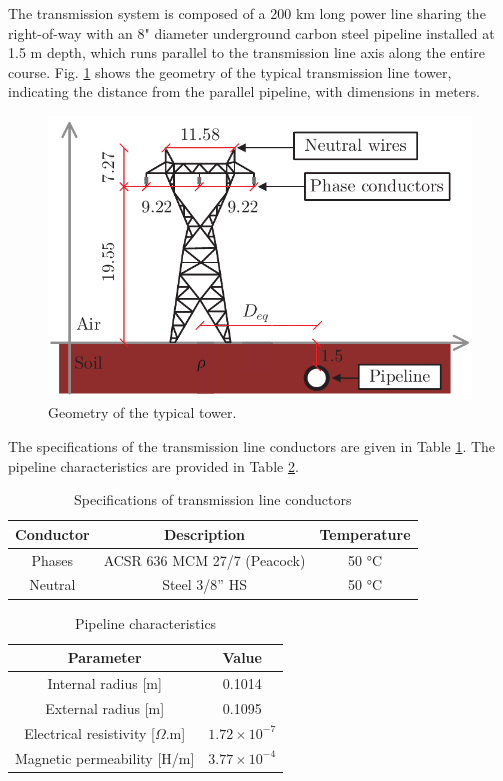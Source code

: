 \documentclass[conference]{IEEEtran}
\begin{document}
	The transmission system is composed of a 200 km long power line sharing the right-of-way with an 8" diameter underground carbon steel pipeline installed at 1.5 m depth, which runs parallel to the transmission line axis along the entire course. Fig.  \ref{fig:SistTesteCorte} shows the geometry of the typical transmission line tower, indicating the distance from the parallel pipeline, with dimensions in meters.
	
	\begin{figure}[hbt]
		\begin{center}
			\includegraphics[width=.8\columnwidth]{fig/SistTesteCorte2.pdf}
			\caption{Geometry of the typical tower.}
			\label{fig:SistTesteCorte}
		\end{center}
	\end{figure}
	
	The specifications of the transmission line conductors  are given in Table \ref{table:LTCond}. The pipeline characteristics are provided in Table \ref{table:PipeParam}.
	
	\begin{table}[!hbt]
		\renewcommand{\arraystretch}{1.3}
		\caption{Specifications of transmission line conductors}
		\label{table:LTCond}
		\centering
		\begin{tabular}{|c|c|c|}
			\hline
			\textbf{Conductor} & \textbf{Description} & \textbf{Temperature} \\
			\hline
			Phases & ACSR 636 MCM 27/7 (Peacock) & 50 °C\\
			\hline
			Neutral & Steel 3/8” HS & 50 °C\\
			\hline
		\end{tabular}
	\end{table}
	
	\begin{table}[!hbt]
		\renewcommand{\arraystretch}{1.3}
		\caption{Pipeline characteristics}
		\label{table:PipeParam}
		\centering
		\begin{tabular}{|c|c|}
			\hline
			\textbf{Parameter} & \textbf{Value} \\
			\hline
			Internal radius [m] & 0.1014\\
			\hline
			External radius [m] & 0.1095\\
			\hline
			Electrical resistivity [$\Omega$.m] & $1.72\times10^{-7}$\\
			\hline
			Magnetic permeability [H/m] & $3.77\times10^{-4}$\\
			\hline
		\end{tabular}
	\end{table}
	
\end{document}

